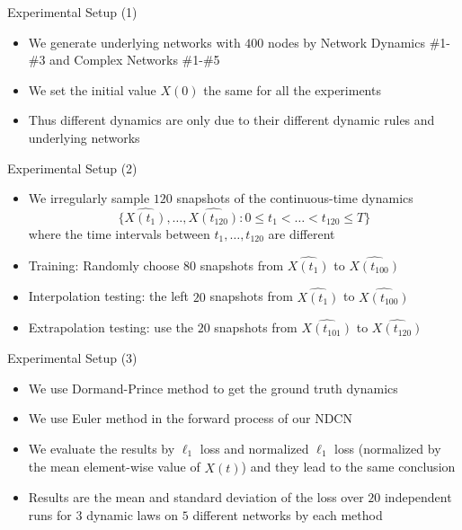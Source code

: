 \documentclass{beamer}
\begin{document}
\begin{frame}{Experimental Setup (1)}
\begin{itemize}
\item We generate underlying networks with $400$ nodes by Network Dynamics \#1-\#3 and Complex Networks \#1-\#5
\item We set the initial value $X(0)$ the same for all the experiments
\item Thus different dynamics are only due to their different dynamic rules and underlying networks
\end{itemize}
\end{frame}

\begin{frame}{Experimental Setup (2)}
\begin{itemize}
\item We irregularly sample $120$ snapshots of the continuous-time dynamics\[
\{\hat{X(t_1)},\dots,\hat{X(t_{120})}:0\leqslant t_1<\dots<t_{120}\leqslant T\}
\]where the time intervals between $t_1,\dots,t_{120}$ are different
\item Training: Randomly choose $80$ snapshots from $\hat{X(t_1)}$ to $\hat{X(t_{100})}$
\item Interpolation testing: the left $20$ snapshots from $\hat{X(t_1)}$ to $\hat{X(t_{100})}$
\item Extrapolation testing: use the $20$ snapshots from $\hat{X(t_{101})}$ to $\hat{X(t_{120})}$
\end{itemize}
\end{frame}

\begin{frame}{Experimental Setup (3)}
\begin{itemize}
\item We use Dormand-Prince method to get the ground truth dynamics
\item We use Euler method in the forward process of our NDCN
\item We evaluate the results by $\ell_1$ loss and normalized $\ell_1$ loss (normalized by the mean element-wise value of $\hat{X(t)}$) and they lead to the same conclusion
\item Results are the mean and standard deviation of the loss over $20$ independent runs for $3$ dynamic laws on $5$ different networks by each method
\end{itemize}
\end{frame}
\end{document}
